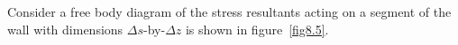 \documentclass{AeroStructure-ERJohnson}
\begin{document}
Consider a free body diagram of the stress resultants acting on a
segment of the wall with dimensions $\Delta s$-by-$\Delta z$ is
shown in figure~\ref{fig8.5}.

\end{document}
